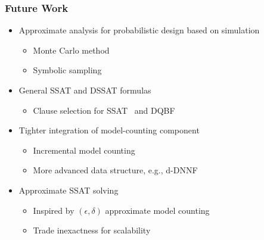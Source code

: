 \begin{frame}
      \frametitle{Future Work}
      \begin{itemize}
            \item Approximate analysis for probabilistic design based on simulation
                  \begin{itemize}
                        \item Monte Carlo method
                        \item Symbolic sampling~\cite{KravetsDAC19ECOSampling}
                  \end{itemize}
                  \pause
            \item General SSAT and DSSAT formulas
                  \begin{itemize}
                        \item Clause selection for SSAT~\cite{Chen2021} and DQBF~\cite{Tentrup2019}
                  \end{itemize}
                  \pause
            \item Tighter integration of model-counting component
                  \begin{itemize}
                        \item Incremental model counting
                        \item More advanced data structure, e.g., d-DNNF~\cite{Darwiche2002dDNNF}
                  \end{itemize}
                  \pause
            \item Approximate SSAT solving
                  \begin{itemize}
                        \item Inspired by $(\epsilon,\delta)$ approximate model counting
                        \item Trade inexactness for scalability
                  \end{itemize}
      \end{itemize}
\end{frame}